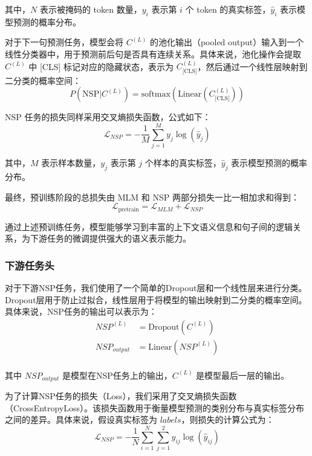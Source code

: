 \documentclass[12pt, a4paper]{ctexart}
\begin{document}
其中，$N$ 表示被掩码的 token 数量，$y_i$ 表示第 $i$ 个 token 的真实标签，$\hat{y}_i$ 表示模型预测的概率分布。


对于下一句预测任务，模型会将 $C^{(L)}$ 的池化输出（pooled output）输入到一个线性分类器中，用于预测前后句是否具有连续关系。具体来说，池化操作会提取 $C^{(L)}$ 中 [CLS] 标记对应的隐藏状态，表示为 $C^{(L)}_{\text{[CLS]}}$，然后通过一个线性层映射到二分类的概率空间：
\begin{equation}
    P(\text{NSP} | C^{(L)}) = \text{softmax}(\text{Linear}(C^{(L)}_{\text{[CLS]}}))
\end{equation}

NSP 任务的损失同样采用交叉熵损失函数，公式如下：
\begin{equation}
    \mathcal{L}_{NSP} = -\frac{1}{M} \sum_{j=1}^{M} y_j \log(\hat{y}_j)
\end{equation}

其中，$M$ 表示样本数量，$y_j$ 表示第 $j$ 个样本的真实标签，$\hat{y}_j$ 表示模型预测的概率分布。

最终，预训练阶段的总损失由 MLM 和 NSP 两部分损失一比一相加求和得到：
\begin{equation}
    \mathcal{L}_{\text{pretrain}} = \mathcal{L}_{MLM} + \mathcal{L}_{NSP}
\end{equation}

通过上述预训练任务，模型能够学习到丰富的上下文语义信息和句子间的逻辑关系，为下游任务的微调提供强大的语义表示能力。

\subsubsection{下游任务头}
对于下游NSP任务，我们使用了一个简单的Dropout层和一个线性层来进行分类。Dropout层用于防止过拟合，线性层用于将模型的输出映射到二分类的概率空间。具体来说，NSP任务的输出可以表示为：
\begin{equation}
    \begin{split}
        NSP^{(L)} &= \text{Dropout}(C^{(L)}) \\
        NSP_{output} &= \text{Linear}(NSP^{(L)}) \\
    \end{split}
\end{equation}

其中 $NSP_{output}$ 是模型在NSP任务上的输出，$C^{(L)}$ 是模型最后一层的输出。

为了计算NSP任务的损失（Loss），我们采用了交叉熵损失函数（CrossEntropyLoss）。该损失函数用于衡量模型预测的类别分布与真实标签分布之间的差异。具体来说，假设真实标签为 $labels$，则损失的计算公式为：
\begin{equation}
    \mathcal{L}_{NSP} = -\frac{1}{N} \sum_{i=1}^{N} \sum_{j=1}^{2} y_{ij} \log(\hat{y}_{ij})
\end{equation}
\end{document}

